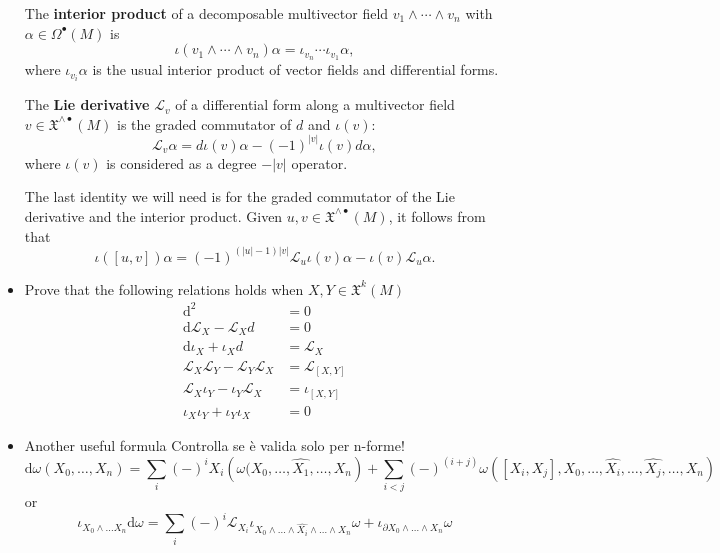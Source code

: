\documentclass[a4paper,12pt]{scrartcl}
\newcommand{\LX}{\mathfrak{X}^{\wedge {\bullet}}}
\renewcommand{\L}{\mathcal{L}}
\renewcommand{\deg}[1]{\left \lvert #1 \right \rvert}
\newcommand{\ExtD}{\textrm{d}}
\newcommand{\Lie}{\mathcal{L}}
\providecommand{\Lie}{\mathcal{L}}%
\begin{document}
\begin{itemize}
The \textbf{interior product} of a decomposable
multivector field $v_{1} \wedge \cdots \wedge v_{n}$ with $\alpha \in \Omega^{\bullet}(M)$ is
\begin{equation} \label{interior}
\iota(v_{1} \wedge \cdots \wedge v_{n}) \alpha = \iota_{v_{n}} \cdots
\iota_{v_{1}} \alpha,
\end{equation}
where $\iota_{v_{i}} \alpha$ is the usual interior product of vector
fields and differential forms. 

The \textbf{Lie derivative} $\L_{v}$ of a differential form along a multivector field $v \in
\LX(M)$ is the graded commutator of $d$ and $\iota(v)$:
\begin{equation} \label{Lie}
\L_{v} \alpha =  d \iota(v) \alpha - (-1)^{\deg{v}} \iota(v) d\alpha,
\end{equation}
where $\iota(v)$ is considered as a degree $-\deg{v}$ operator.

The last identity we will need is for the graded commutator of
the Lie derivative and the interior product. Given $u,v \in
\LX(M)$, it follows from  \cite[Proposition A3]{Forger} that
\begin{equation} \label{commutator}
\iota([u,v]) \alpha = (-1)^{(\deg{u}-1)\deg{v}} \L_{u} \iota(v)  \alpha - \iota(v)\L_{u} \alpha.
\end{equation}
	
	\item Prove that the following relations holds when $X,Y \in \mathfrak{X}^k(M)$
				\begin{align}
					\ExtD^2 &= 0 \label{cartfirst}\\
					\ExtD \Lie_X - \Lie_X d &= 0 \\
					\ExtD \iota_X + \iota_X d &= \Lie_X \label{magic}\\
					\Lie_X \Lie_Y - \Lie_Y \Lie_X &= \Lie_{[X,Y]} \\
					\Lie_X \iota_Y - \iota_Y \Lie_X &= \iota_{[X,Y]}\\
					\iota_X \iota_Y + \iota_Y \iota_X &= 0 \label{cartlast}
				\end{align}	
	


	\item Another useful formula
				Controlla se è valida solo per n-forme!
		\begin{displaymath}
			\ExtD \omega (X_0, \ldots, X_n) = 
			\sum_i (-)^i X_i\left( \omega(X_0,\ldots,\hat{X_1},\ldots,X_n \right) +
			\sum_{i < j} (-)^{(i+j)} \omega\left([X_i,X_j],X_0,\ldots,\hat{X_i},\ldots,\hat{X_j},\ldots, X_n \right)
		\end{displaymath}
		or
		\begin{displaymath}
		\iota_{X_0\wedge \ldots X_n} \ExtD \omega =
		\sum_i (-)^i \Lie_{X_i} \iota_{X_0\wedge\ldots\wedge \hat{X_i}\wedge\ldots\wedge X_n} \omega
		+ \iota_{\partial X_0 \wedge\ldots\wedge X_n} \omega		
		\end{displaymath}


	\end{itemize}
\end{document}

